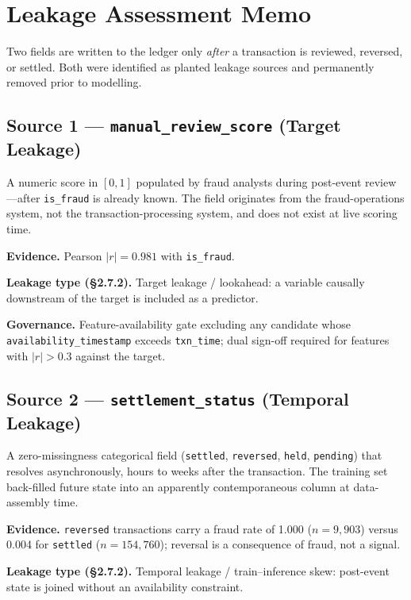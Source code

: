 \documentclass[10pt,a4paper]{article}
\begin{document}
\section{Leakage Assessment Memo}
\label{sec:leakage}

Two fields are written to the ledger only \emph{after} a transaction is
reviewed, reversed, or settled. Both were identified as planted leakage
sources and permanently removed prior to modelling.

\subsection*{Source 1 --- \texttt{manual\_review\_score} (Target Leakage)}

A numeric score in $[0,1]$ populated by fraud analysts during post-event
review---after \texttt{is\_fraud} is already known. The field originates from
the fraud-operations system, not the transaction-processing system, and does
not exist at live scoring time.

\textbf{Evidence.} Pearson $|r|{=}0.981$ with \texttt{is\_fraud}.

\textbf{Leakage type (\S2.7.2).} Target leakage / lookahead: a variable
causally downstream of the target is included as a predictor.

\textbf{Governance.} Feature-availability gate excluding any candidate
whose \texttt{availability\_timestamp} exceeds \texttt{txn\_time}; dual
sign-off required for features with $|r|{>}0.3$ against the target.

\subsection*{Source 2 --- \texttt{settlement\_status} (Temporal Leakage)}

A zero-missingness categorical field (\texttt{settled}, \texttt{reversed},
\texttt{held}, \texttt{pending}) that resolves asynchronously, hours to weeks
after the transaction. The training set back-filled future state into an
apparently contemporaneous column at data-assembly time.

\textbf{Evidence.} \texttt{reversed} transactions carry a fraud rate of
1.000 ($n{=}9{,}903$) versus 0.004 for \texttt{settled}
($n{=}154{,}760$); reversal is a consequence of fraud, not a signal.

\textbf{Leakage type (\S2.7.2).} Temporal leakage / train--inference
skew: post-event state is joined without an availability constraint.
\end{document}
